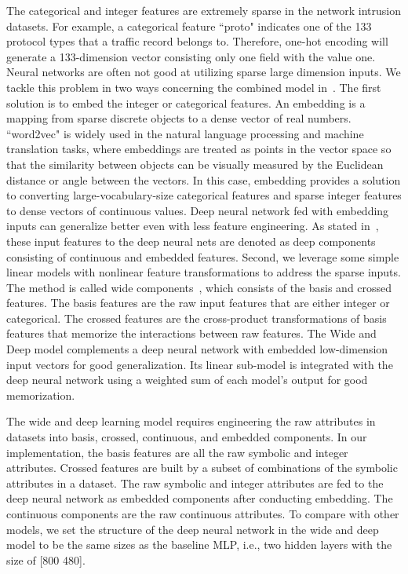 \label{SubSec:WD}
The categorical and integer features are extremely sparse in the network intrusion datasets.
For example, a categorical feature ``proto" indicates one of the 133 protocol types that a traffic record belongs to. Therefore, one-hot encoding will generate a 133-dimension vector consisting only one field with the value one. Neural networks are often not good at utilizing sparse large dimension inputs.
We tackle this problem in two ways concerning the combined model in~\cite{WideDeepModel}.
The first solution is to embed the integer or categorical features.
An embedding is a mapping from sparse discrete objects to a dense vector of real numbers.
``word2vec" is widely used in the natural language processing and machine translation tasks, where embeddings are treated as points in the vector space so that the similarity between objects can be visually measured
by the Euclidean distance or angle between the vectors.
In this case, embedding provides a solution to converting large-vocabulary-size categorical features and sparse integer features to dense vectors of continuous values.
Deep neural network fed with embedding inputs can generalize better even with less feature engineering.
As stated in~\cite{WideDeepModel}, these input features to the deep neural nets are denoted as deep components consisting of continuous and embedded features.
Second, we leverage some simple linear models with nonlinear feature transformations to address the sparse inputs. The method is called wide components~\cite{WideDeepModel}, which consists of the basis and crossed features.
The basis features are the raw input features that are either integer or categorical.
The crossed features are the cross-product transformations of basis features that memorize the interactions between raw features.
The Wide and Deep model complements a deep neural network
with embedded low-dimension input vectors for good generalization.
Its linear sub-model is integrated with the deep neural network using a weighted sum of each model's output for good memorization.

The wide and deep learning model requires engineering the raw attributes in datasets into basis, crossed, continuous, and embedded components.
In our implementation, the basis features are all the raw symbolic and integer attributes.
Crossed features are built by a subset of combinations of the symbolic attributes in a dataset.
The raw symbolic and integer attributes are fed to the deep neural network as embedded components after conducting embedding.
The continuous components are the raw continuous attributes.
To compare with other models, we set the structure of the deep neural network in the wide and deep model to be the same sizes as the baseline MLP, i.e., two hidden layers with the size of [800 480].

